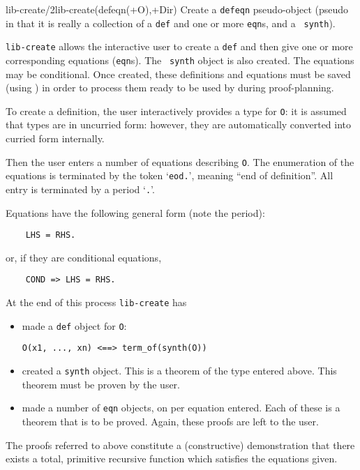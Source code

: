 \begin{predicate}{lib-create/2}{lib-create(defeqn(+O),+Dir)}%
Create a {\tt defeqn} pseudo-object (pseudo in that it is really a
collection of a {\tt def} and one or more {\tt eqn}s, and a {\tt
synth}).

{\tt lib-create} allows the interactive user to create a {\tt def} and
then give one or more corresponding equations ({\tt eqn}s). The {\tt
synth} object is also created.  The equations may be conditional.
Once created, these definitions and equations must be saved (using
) in order to process them ready to be used by
\clam{} during proof-planning. 

To create a definition, the user interactively provides a type for
{\tt O}: it is assumed that types are in uncurried form: however, they
are automatically converted into curried form internally.

Then the user enters a number of equations describing {\tt O}. The
enumeration of the equations is terminated by the token `{\tt eod.}',
meaning ``end of definition''.  All entry is terminated by a period
`{\tt .}'.

Equations have the following general form (note the period):
\begin{verbatim}
    LHS = RHS.
\end{verbatim}
or, if they are conditional equations, 
\begin{verbatim}
    COND => LHS = RHS.
\end{verbatim}

At the end of this process {\tt lib-create} has
\begin{itemize}
\item made a {\tt def} object for {\tt O}:
\begin{center}
        \verb|O(x1, ..., xn) <==> term_of(synth(O))|
\end{center}
\item created a {\tt synth} object.  This is a theorem of the type
entered above.  This theorem must be proven by the user.

\item made a number of {\tt eqn} objects, on per equation entered.
Each of these is a theorem that is to be proved.  Again, these proofs
are left to the user. 
\end{itemize}
The proofs referred to above constitute a (constructive) demonstration
that there exists a total, primitive recursive function which
satisfies the equations given. 



\end{predicate}
